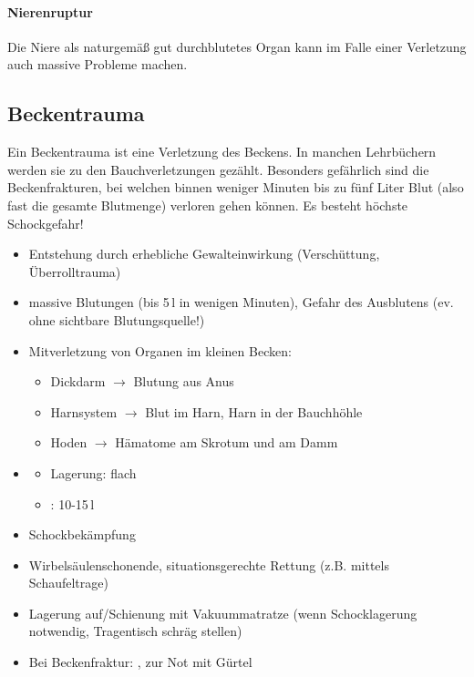 \paragraph{Nierenruptur}\label{topic:nierenruptur}
Die Niere als naturgemäß gut durchblutetes Organ kann im
Falle einer Verletzung auch massive Probleme machen.


\subsection{Beckentrauma}
\label{topic:beckentrauma}

Ein Beckentrauma ist eine Verletzung des Beckens. In manchen Lehrbüchern werden
sie zu den Bauchverletzungen gezählt. Besonders gefährlich sind die
Beckenfrakturen, bei welchen binnen weniger Minuten bis zu fünf Liter Blut (also
fast die gesamte Blutmenge) verloren gehen können. Es besteht höchste
Schockgefahr!

\begin{itemize}
  \item Entstehung durch erhebliche Gewalteinwirkung  (Verschüttung, Überrolltrauma)
  \item massive  Blutungen (bis 5\,l in wenigen  Minuten),
  Gefahr des Ausblutens (ev. ohne sichtbare  Blutungsquelle!)
  \item Mitverletzung von Organen im kleinen  Becken:
  \begin{itemize}
    \item Dickdarm ${\rightarrow}$ Blutung aus Anus
    \item Harnsystem ${\rightarrow}$ Blut im Harn, Harn in der
    Bauchhöhle
    \item Hoden ${\rightarrow}$ Hämatome am Skrotum und am  Damm
  \end{itemize}
\end{itemize}


{
\begin{itemize}
  \item \TxMassVitBes
  \begin{itemize}
    \item Lagerung: flach
    \item {}: 10-15\,l
  \end{itemize}
  \item Schockbekämpfung
  \item Wirbelsäulenschonende, situationsgerechte Rettung (z.B. mittels
  Schaufeltrage)
  \item Lagerung auf/Schienung mit Vakuummatratze (wenn Schocklagerung notwendig, Tragentisch schräg stellen)
  \item Bei Beckenfraktur:
  , zur Not mit
  Gürtel
\end{itemize}
}


